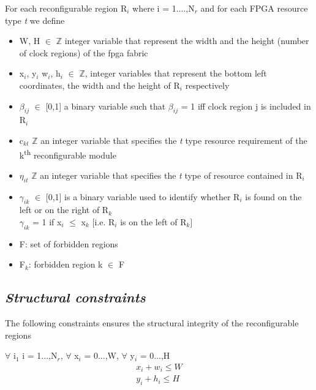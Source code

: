 For each reconfigurable region R$_i$ where i = 1....,N$_r$ and for each FPGA resource type \textit{t} we define
\begin{itemize}
\item W, H $\in$ $\mathbb{Z}$ integer variable that represent the width and the height (number of clock regions) of the fpga fabric

\item x$_i$, y$_i$ w$_i$, h$_i$ $\in$ $\mathbb{Z}$, integer variables that represent the bottom left coordinates, the width and the height of R$_i$  respectively

\item $\beta_{ij}$ $\in$ [0,1] a binary variable such that $\beta_{ij}$ = 1 iff clock region j is included in R$_i$

\item c$_{kt}$ $\mathbb{Z}$  an integer variable that specifies the \textit{t} type resource requirement of the k\textsuperscript{th} reconfigurable module

\item $\eta_{it}$ $\mathbb{Z}$ an integer variable that specifies the \textit{t} type of resource contained in R$_i$

\item $\gamma_{ik}$ $\in$ [0,1] is a binary variable used to identify whether R$_i$ is found on the left or on the right of R$_k$\\
$\gamma_{ik}$ = 1 if x$_i$ $\leq$ x$_k$ [i.e. R$_i$ is on the left of R$_k$]

\item F: set of forbidden regions 

\item F$_k$: forbidden region k $\in$ F

\end{itemize}

\subsection{\textit{Structural constraints}}
The following constraints ensures the structural integrity of the reconfigurable regions

\begin{constraint} $\forall$ i$_1$ i = 1...,N$_r$, $\forall$ x$_i$ = 0...,W, $\forall$ y$_i$ = 0...,H    
\begin{equation}
\label{form:eq:1}
\begin{split}
x_i + w_i \leq W \\
y_i + h_i \leq H \\
\end{split}
\end{equation} 
\end{constraint}

